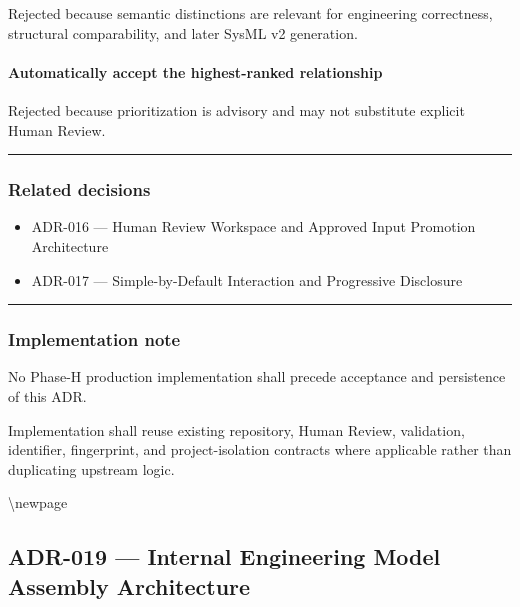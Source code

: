 Rejected because semantic distinctions are relevant for engineering correctness, structural comparability, and later SysML v2 generation.

\hypertarget{automatically-accept-the-highest-ranked-relationship}{%
\paragraph{Automatically accept the highest-ranked relationship}\label{automatically-accept-the-highest-ranked-relationship}}

Rejected because prioritization is advisory and may not substitute explicit Human Review.

\begin{center}\rule{0.5\linewidth}{0.5pt}\end{center}

\hypertarget{related-decisions}{%
\subsubsection{Related decisions}\label{related-decisions}}

\begin{itemize}
\tightlist
\item
  ADR-016 --- Human Review Workspace and Approved Input Promotion Architecture
\item
  ADR-017 --- Simple-by-Default Interaction and Progressive Disclosure
\end{itemize}

\begin{center}\rule{0.5\linewidth}{0.5pt}\end{center}

\hypertarget{implementation-note}{%
\subsubsection{Implementation note}\label{implementation-note}}

No Phase-H production implementation shall precede acceptance and persistence of this ADR.

Implementation shall reuse existing repository, Human Review, validation, identifier, fingerprint, and project-isolation contracts where applicable rather than duplicating upstream logic.

\textbackslash newpage

\hypertarget{adr-019--internal-engineering-model-assembly-architecture}{%
\subsection{ADR-019 --- Internal Engineering Model Assembly Architecture}\label{adr-019--internal-engineering-model-assembly-architecture}}

